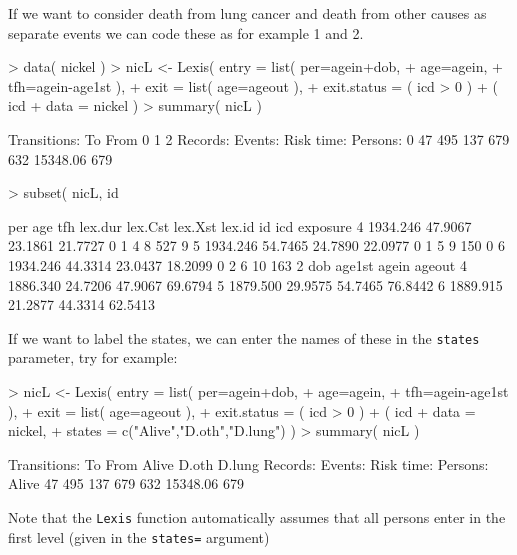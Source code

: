 \documentclass[a4paper,twoside,12pt]{article}
\begin{document}
If we want to consider death from lung cancer and death from other
causes as separate events we can code these as for example 1 and 2.
\begin{Schunk}
\begin{Sinput}
> data( nickel )
> nicL <- Lexis( entry = list( per=agein+dob,
+                              age=agein,
+                              tfh=agein-age1st ),
+                 exit = list( age=ageout ),
+          exit.status = ( icd > 0 ) + ( icd %in% c(162,163) ),
+                 data = nickel )
> summary( nicL )
\end{Sinput}
\begin{Soutput}
Transitions:
     To
From  0   1   2  Records:  Events: Risk time:  Persons:
   0 47 495 137       679      632   15348.06       679
\end{Soutput}
\begin{Sinput}
> subset( nicL, id %in% 8:10 )
\end{Sinput}
\begin{Soutput}
       per     age     tfh lex.dur lex.Cst lex.Xst lex.id id icd exposure
4 1934.246 47.9067 23.1861 21.7727       0       1      4  8 527        9
5 1934.246 54.7465 24.7890 22.0977       0       1      5  9 150        0
6 1934.246 44.3314 23.0437 18.2099       0       2      6 10 163        2
       dob  age1st   agein  ageout
4 1886.340 24.7206 47.9067 69.6794
5 1879.500 29.9575 54.7465 76.8442
6 1889.915 21.2877 44.3314 62.5413
\end{Soutput}
\end{Schunk}
If we want to label the states, we can enter the names of these in the
\texttt{states} parameter, try for example:
\begin{Schunk}
\begin{Sinput}
> nicL <- Lexis( entry = list( per=agein+dob,
+                              age=agein,
+                              tfh=agein-age1st ),
+                 exit = list( age=ageout ),
+          exit.status = ( icd > 0 ) + ( icd %in% c(162,163) ),
+                 data = nickel,
+               states = c("Alive","D.oth","D.lung") )
> summary( nicL )
\end{Sinput}
\begin{Soutput}
Transitions:
     To
From    Alive D.oth D.lung  Records:  Events: Risk time:  Persons:
  Alive    47   495    137       679      632   15348.06       679
\end{Soutput}
\end{Schunk}

Note that the \texttt{Lexis} function automatically assumes that all
persons enter in the first level (given in the \texttt{states=}
argument)
\end{document}
